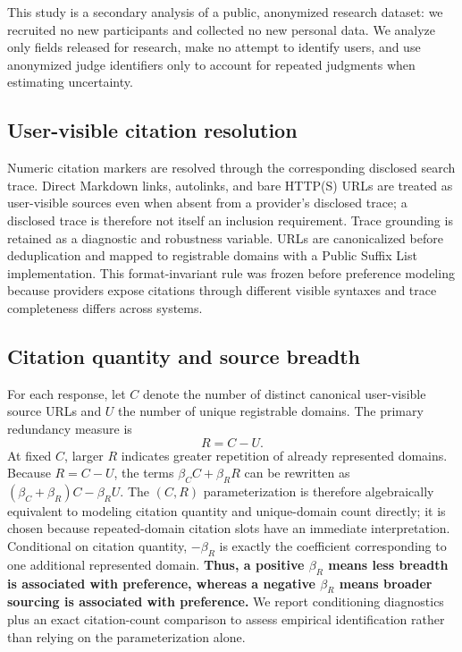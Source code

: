 \documentclass[sigconf,natbib=true,anonymous=true]{acmart}
\begin{document}
This study is a secondary analysis of a public, anonymized research dataset: we recruited no new participants and collected no new personal data. We analyze only fields released for research, make no attempt to identify users, and use anonymized judge identifiers only to account for repeated judgments when estimating uncertainty.

\subsection{User-visible citation resolution}
Numeric citation markers are resolved through the corresponding disclosed search trace. Direct Markdown links, autolinks, and bare HTTP(S) URLs are treated as user-visible sources even when absent from a provider's disclosed trace; a disclosed trace is therefore not itself an inclusion requirement. Trace grounding is retained as a diagnostic and robustness variable. URLs are canonicalized before deduplication and mapped to registrable domains with a Public Suffix List implementation. This format-invariant rule was frozen before preference modeling because providers expose citations through different visible syntaxes and trace completeness differs across systems.

\subsection{Citation quantity and source breadth}
For each response, let $C$ denote the number of distinct canonical user-visible source URLs and $U$ the number of unique registrable domains. The primary redundancy measure is
\begin{equation}
R = C-U.
\end{equation}
At fixed $C$, larger $R$ indicates greater repetition of already represented domains. Because $R=C-U$, the terms $\beta_C C + \beta_R R$ can be rewritten as $(\beta_C+\beta_R)C-\beta_R U$. The $(C,R)$ parameterization is therefore algebraically equivalent to modeling citation quantity and unique-domain count directly; it is chosen because repeated-domain citation slots have an immediate interpretation. Conditional on citation quantity, $-\beta_R$ is exactly the coefficient corresponding to one additional represented domain. \textbf{Thus, a positive $\beta_R$ means less breadth is associated with preference, whereas a negative $\beta_R$ means broader sourcing is associated with preference.} We report conditioning diagnostics plus an exact citation-count comparison to assess empirical identification rather than relying on the parameterization alone.
\end{document}
